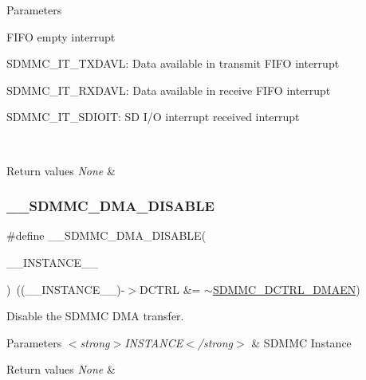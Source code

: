 \begin{DoxyParams}{Parameters}
\begin{DoxyItemize}
F\+I\+FO empty interrupt \item S\+D\+M\+M\+C\+\_\+\+I\+T\+\_\+\+T\+X\+D\+A\+VL\+: Data available in transmit F\+I\+FO interrupt \item S\+D\+M\+M\+C\+\_\+\+I\+T\+\_\+\+R\+X\+D\+A\+VL\+: Data available in receive F\+I\+FO interrupt \item S\+D\+M\+M\+C\+\_\+\+I\+T\+\_\+\+S\+D\+I\+O\+IT\+: SD I/O interrupt received interrupt\end{DoxyItemize}
\\
\hline
\end{DoxyParams}

\begin{DoxyRetVals}{Return values}
{\em None} & \\
\hline
\end{DoxyRetVals}
\mbox{\label{group___s_d_m_m_c___l_l___interrupt___clock_ga4fca947c530ed9f953460eb48583fd9d}} 
\subsubsection{\texorpdfstring{\_\_SDMMC\_DMA\_DISABLE}{\_\_SDMMC\_DMA\_DISABLE}}
{\footnotesize\ttfamily \#define \+\_\+\+\_\+\+S\+D\+M\+M\+C\+\_\+\+D\+M\+A\+\_\+\+D\+I\+S\+A\+B\+LE(\begin{DoxyParamCaption}\item[{}]{\+\_\+\+\_\+\+I\+N\+S\+T\+A\+N\+C\+E\+\_\+\+\_\+ }\end{DoxyParamCaption})~((\+\_\+\+\_\+\+I\+N\+S\+T\+A\+N\+C\+E\+\_\+\+\_\+)-\/$>$D\+C\+T\+RL \&= $\sim$\mbox{\hyperlink{group___peripheral___registers___bits___definition_ga47f4fcb4a5ec9a4e8d077a5edc82ebf8}{S\+D\+M\+M\+C\+\_\+\+D\+C\+T\+R\+L\+\_\+\+D\+M\+A\+EN}})}



Disable the S\+D\+M\+MC D\+MA transfer. 


\begin{DoxyParams}{Parameters}
{\em $<$strong$>$\+I\+N\+S\+T\+A\+N\+C\+E$<$/strong$>$} & S\+D\+M\+MC Instance\\
\hline
\end{DoxyParams}

\begin{DoxyRetVals}{Return values}
{\em None} & \\
\hline
\end{DoxyRetVals}
\mbox{\label{group___s_d_m_m_c___l_l___interrupt___clock_ga57d82a8c4be7b1dc8d2ff4cae11c2339}} 
